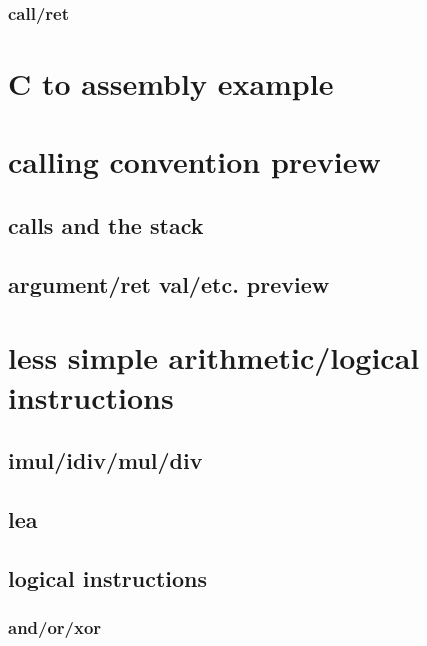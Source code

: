 

\subsubsection{call/ret}



\section{C to assembly example}



\section{calling convention preview}

\subsection{calls and the stack}



\subsection{argument/ret val/etc. preview}



\section{less simple arithmetic/logical instructions}

\subsection{imul/idiv/mul/div}



\subsection{lea}




\subsection{logical instructions}

\subsubsection{and/or/xor}


